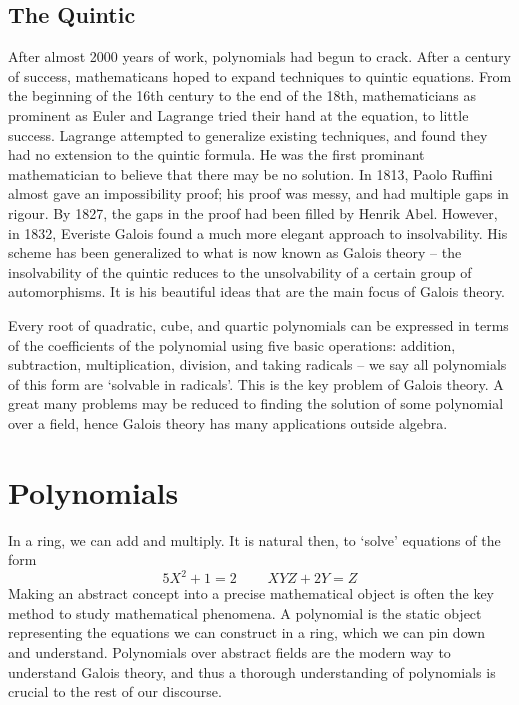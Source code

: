 \section{The Quintic}

After almost 2000 years of work, polynomials had begun to crack. After a century of success, mathematicans hoped to expand techniques to quintic equations. From the beginning of the 16th century to the end of the 18th, mathematicians as prominent as Euler and Lagrange tried their hand at the equation, to little success. Lagrange attempted to generalize existing techniques, and found they had no extension to the quintic formula. He was the first prominant mathematician to believe that there may be no solution. In 1813, Paolo Ruffini almost gave an impossibility proof; his proof was messy, and had multiple gaps in rigour. By 1827, the gaps in the proof had been filled by Henrik Abel. However, in 1832, Everiste Galois found a much more elegant approach to insolvability. His scheme has been generalized to what is now known as Galois theory -- the insolvability of the quintic reduces to the unsolvability of a certain group of automorphisms. It is his beautiful ideas that are the main focus of Galois theory.

Every root of quadratic, cube, and quartic polynomials can be expressed in terms of the coefficients of the polynomial using five basic operations: addition, subtraction, multiplication, division, and taking radicals -- we say all polynomials of this form are `solvable in radicals'. This is the key problem of Galois theory. A great many problems may be reduced to finding the solution of some polynomial over a field, hence Galois theory has many applications outside algebra.








\chapter{Polynomials}

In a ring, we can add and multiply. It is natural then, to `solve' equations of the form
%
\[ 5 X^2 + 1 = 2\ \ \ \ \ \ \ \ \ \ XYZ + 2Y = Z \]
%
Making an abstract concept into a precise mathematical object is often the key method to study mathematical phenomena. A polynomial is the static object representing the equations we can construct in a ring, which we can pin down and understand. Polynomials over abstract fields are the modern way to understand Galois theory, and thus a thorough understanding of polynomials is crucial to the rest of our discourse.


